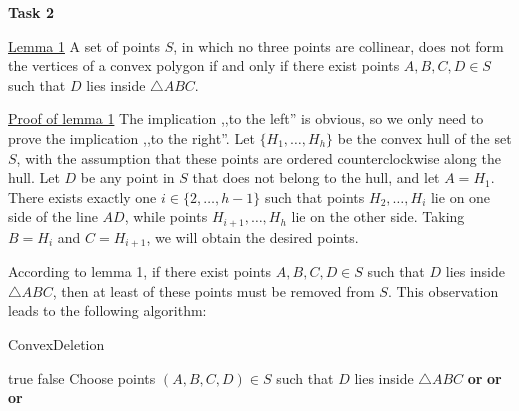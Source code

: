 \documentclass[12pt]{article}
\begin{document}
	\newpage
	
	\textbf{Task 2}
	
	\medskip
	
	\underline{Lemma 1} A set of points \(S\), in which no three points are
	collinear, does not form the vertices of a convex polygon if and only if
	there exist points \(A, B, C, D \in S\) such that \(D\) lies inside
	\(\triangle ABC\).
	
	\medskip
	
	\underline{Proof of lemma 1} The implication ,,to the left'' is obvious,
	so we only need to prove the implication ,,to the right''. Let \(\{H_{1},
	\ldots, H_{h}\}\) be the convex hull of the set \(S\), with the assumption
	that these points are ordered counterclockwise along the hull. Let \(D\) be
	any point in \(S\) that does not belong to the hull, and let \(A = H_{1}\).
	There exists exactly one \(i \in \{2, \ldots, h - 1\}\) such that points
	\(H_{2}, \ldots, H_{i}\) lie on one side of the line \(AD\), while points
	\(H_{i + 1}, \ldots, H_{h}\) lie on the other side. Taking \(B = H_{i}\) and
	\(C = H_{i + 1}\), we will obtain the desired points.
	
	\medskip
	
	According to lemma 1, if there exist points \(A, B, C, D \in S\) such that
	\(D\) lies inside \(\triangle ABC\), then at least of these points must be
	removed from \(S\). This observation leads to the following algorithm:
	
	\begin{algorithm}
		\caption{ConvexDeletion} \label{alg:alg1}
		\begin{algorithmic}[1]
			        \State \Return true
			    \EndIf
			        \State \Return false
			    \EndIf
			    \State Choose points $(A, B, C, D) \in S$ such that $D$ lies
			           inside $\triangle ABC$
			    \State \Return {}
			           \textbf{or}
			           \textbf{or}
			    \Statex \hspace{4.685em}
			           \textbf{or}
			\EndProcedure
		\end{algorithmic}
	\end{algorithm}
	
\end{document}
